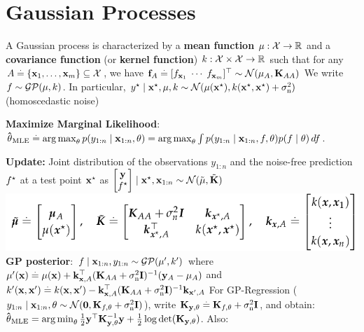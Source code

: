 \section{Gaussian Processes}
\begin{framed}
    A Gaussian process is characterized by a \textbf{mean function} $\mu : \mathcal{X} \to \mathbb{R}$ and a \textbf{covariance function} (or \textbf{kernel function}) $k : \mathcal{X} \times \mathcal{X} \to \mathbb{R}$ such that for any $A \overset{.}{=} \{\mathbf{x}_1, \dots, \mathbf{x}_m\} \subseteq \mathcal{X}$, we have 
  $\vf_\sA \defeq \transpose{[f_{\vx_1} \; \cdots \; f_{\vx_m}]} \sim \N{\vmu_\sA}{\mK_{\sA\sA}}$ 
We write $f \sim \GP{\mu}{k}$.
In particular,  
  $\ys \mid \vxs, \mu, k \sim \N{\mu(\vxs)}{k(\vxs, \vxs) + \sigman^2}$ (homoscedastic noise)
\end{framed}
\begin{framed}
    \textbf{Maximize Marginal Likelihood}: \\
    $ \mathbf{\hat{\theta}}_{\mathrm{MLE}} \overset{.}{=} \operatorname*{arg\,max}_{\mathbf{\theta}} p(y_{1:n} \mid \mathbf{x}_{1:n}, \mathbf{\theta}) \\= \operatorname*{arg\,max}_{\mathbf{\theta}} \int p(y_{1:n} \mid \mathbf{x}_{1:n}, f, \mathbf{\theta}) p(f \mid \mathbf{\theta}) \,d f$.
\end{framed}
\textbf{Update:} Joint distribution of the observations $y_{1:n}$ and the noise-free prediction $f^\star$ at a test point $\mathbf{x^\star}$ as $\begin{bmatrix}
    \vy \\
    \fs \\
  \end{bmatrix} \mid \vxs, \vx_{1:n} \sim \N{\Tilde{\vmu}}{\Tilde{\mK}}$ \\
\includegraphics[width=\linewidth]{images/GP_Update}
\textbf{GP posterior}: 
$f \mid \vx_{1:n}, y_{1:n} \sim \GP{\mu'}{k'}$ where $
  \mu'(\mathbf{x}) \overset{.}{=} \mu(\mathbf{x}) + \mathbf{k}_{\mathbf{x},A}^\top (\mathbf{K}_{AA} + \sigma_{\mathrm{n}}^2 \mathbf{I})^{-1} (\mathbf{y}_A - \mathbf{\mu}_A)$ and $
  k'(\mathbf{x}, \mathbf{x'}) \overset{.}{=} k(\mathbf{x}, \mathbf{x'}) - \mathbf{k}_{\mathbf{x},A}^\top (\mathbf{K}_{AA} + \sigma_{\mathrm{n}}^2 \mathbf{I})^{-1} \mathbf{k}_{\mathbf{x'},A}$
For GP-Regression ($y_{1:n} \mid \vx_{1:n}, \vtheta \sim \N{\vzero}{\mK_{f,\vtheta} + \sigman^2 \mI}$), write $\mathbf{K}_{\mathbf{y},\mathbf{\theta}} \overset{.}{=} \mathbf{K}_{f,\mathbf{\theta}} + \sigma_{\mathrm{n}}^2 \mathbf{I}$, and obtain: $\vthetahat_\MLE = \argmin_{\vtheta} \frac{1}{2} \transpose{\vy} \inv{\mK_{\vy,\vtheta}} \vy + \frac{1}{2} \log \det{\mK_{\vy,\vtheta}}$. Also:

